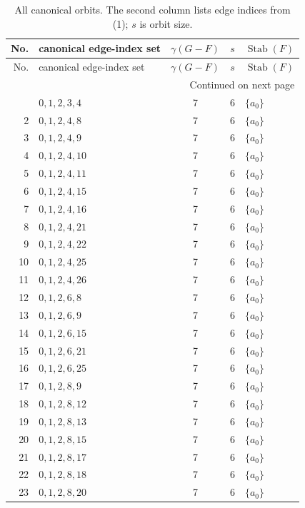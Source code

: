 \documentclass[10pt]{article}
\begin{document}
\begin{longtable}{@{}r l c c l@{}}
\caption{All canonical orbits.  The second column lists edge indices from (1); $s$ is orbit size.\label{tab:orbits}}\\
\toprule
No. & canonical edge-index set & $\gamma(G-F)$ & $s$ & $\operatorname{Stab}(F)$\\
\midrule
\endfirsthead
\toprule
No. & canonical edge-index set & $\gamma(G-F)$ & $s$ & $\operatorname{Stab}(F)$\\
\midrule
\endhead
\midrule
\multicolumn{5}{r}{Continued on next page}\\
\endfoot
\bottomrule
\endlastfoot
1 & $0,1,2,3,4$ & 7 & 6 & $\{a_{0}\}$\\
2 & $0,1,2,4,8$ & 7 & 6 & $\{a_{0}\}$\\
3 & $0,1,2,4,9$ & 7 & 6 & $\{a_{0}\}$\\
4 & $0,1,2,4,10$ & 7 & 6 & $\{a_{0}\}$\\
5 & $0,1,2,4,11$ & 7 & 6 & $\{a_{0}\}$\\
6 & $0,1,2,4,15$ & 7 & 6 & $\{a_{0}\}$\\
7 & $0,1,2,4,16$ & 7 & 6 & $\{a_{0}\}$\\
8 & $0,1,2,4,21$ & 7 & 6 & $\{a_{0}\}$\\
9 & $0,1,2,4,22$ & 7 & 6 & $\{a_{0}\}$\\
10 & $0,1,2,4,25$ & 7 & 6 & $\{a_{0}\}$\\
11 & $0,1,2,4,26$ & 7 & 6 & $\{a_{0}\}$\\
12 & $0,1,2,6,8$ & 7 & 6 & $\{a_{0}\}$\\
13 & $0,1,2,6,9$ & 7 & 6 & $\{a_{0}\}$\\
14 & $0,1,2,6,15$ & 7 & 6 & $\{a_{0}\}$\\
15 & $0,1,2,6,21$ & 7 & 6 & $\{a_{0}\}$\\
16 & $0,1,2,6,25$ & 7 & 6 & $\{a_{0}\}$\\
17 & $0,1,2,8,9$ & 7 & 6 & $\{a_{0}\}$\\
18 & $0,1,2,8,12$ & 7 & 6 & $\{a_{0}\}$\\
19 & $0,1,2,8,13$ & 7 & 6 & $\{a_{0}\}$\\
20 & $0,1,2,8,15$ & 7 & 6 & $\{a_{0}\}$\\
21 & $0,1,2,8,17$ & 7 & 6 & $\{a_{0}\}$\\
22 & $0,1,2,8,18$ & 7 & 6 & $\{a_{0}\}$\\
23 & $0,1,2,8,20$ & 7 & 6 & $\{a_{0}\}$\\

\end{longtable}
\end{document}

